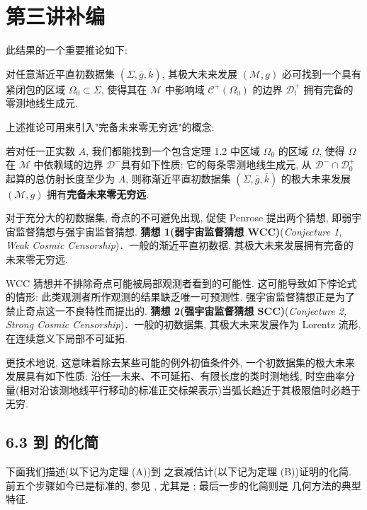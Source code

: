 \chapter{第三讲补编}

此结果的一个重要推论如下:
\begin{theorem}\label{thm:6.1}
对任意渐近平直初数据集 $(\Sigma,\bar g,\bar k)$, 其极大未来发展 $(\mathcal{M},g)$ 必可找到一个具有紧闭包的区域 $\Omega_0\subset\Sigma$, 使得其在 $\mathcal{M}$ 中影响域 $\mathcal{C}^+(\Omega_0)$ 的边界 $\mathcal{D}_l^+$ 拥有完备的零测地线生成元.\end{theorem}

上述推论可用来引入"完备未来零无穷远"的概念:
\begin{definition}\label{def:6.2}
若对任一正实数 $A$, 我们都能找到一个包含定理 1.2 中区域 $\Omega_0$ 的区域 $\Omega$, 使得 $\Omega$ 在 $\mathcal{M}$ 中依赖域的边界 $\mathcal{D}^-$具有如下性质: 它的每条零测地线生成元, 从 $\mathcal{D}^-\cap\mathcal{D}_0^+$ 起算的总仿射长度至少为 $A$, 则称渐近平直初数据集 $(\Sigma,\bar g,\bar k)$ 的极大未来发展 $(\mathcal{M},g)$ 拥有\textbf{完备未来零无穷远}.\end{definition}

对于充分大的初数据集, 奇点的不可避免出现, 促使 Penrose 提出两个猜想, 即弱宇宙监督猜想与强宇宙监督猜想.
\noindent\textbf{猜想 1(弱宇宙监督猜想 WCC)}(\textit{Conjecture 1, Weak Cosmic Censorship})．\label{conj:wcc}一般的渐近平直初数据, 其极大未来发展拥有完备的未来零无穷远.
\par\medskip

WCC 猜想并不排除奇点可能被局部观测者看到的可能性. 这可能导致如下悖论式的情形: 此类观测者所作观测的结果缺乏唯一可预测性. 强宇宙监督猜想正是为了禁止奇点这一不良特性而提出的.
\noindent\textbf{猜想 2(强宇宙监督猜想 SCC)}(\textit{Conjecture 2, Strong Cosmic Censorship})．\label{conj:scc}一般的初数据集, 其极大未来发展作为 Lorentz 流形, 在连续意义下局部不可延拓.
\par\medskip

更技术地说, 这意味着除去某些可能的例外初值条件外, 一个初数据集的极大未来发展具有如下性质: 沿任一未来、不可延拓、有限长度的类时测地线, 时空曲率分量(相对沿该测地线平行移动的标准正交标架表示)当弧长趋近于其极限值时必趋于无穷.
\section*{6.3  到 的化简}

下面我们描述(以下记为定理 (A))到 之衰减估计(以下记为定理 (B))证明的化简. 前五个步骤如今已是标准的, 参见 \cite{klai2}, 尤其是 \cite{klai72}; 最后一步的化简则是 \cite{klai29} 几何方法的典型特征.
